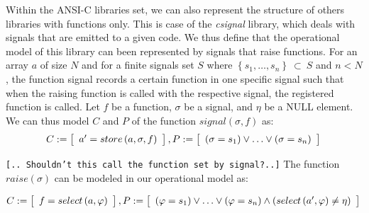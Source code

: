\documentclass[a4paper]{llncs}
\newcommand{\blurb}[1]{{\texttt{[.. #1..]}}}
\begin{document}
Within the ANSI-C libraries set, we can also represent the structure
of others libraries with functions only. This is case of the \textit{csignal}
library, which deals with signals that are emitted to a given code.
We thus define that the operational model of this library can been represented
by signals that raise functions. For an array $a$ of size $N$ and
for a finite signals set $S$ where $\left\{s_{1},\ldots, s_{n}\right\}\:\subset\:S$
and $n < N$, the function signal records a certain function in one specific signal
such that when the raising function is called with the respective signal,
the registered function is called. Let $f$ be a function, $\sigma$ be a signal,
and $\eta$ be a NULL element. We can thus model $C$ and $P$
of the function $signal\left(\sigma, f\right)$ as:
%
\begin{equation}
\label{quantifier-free-formulae-sginal}
C := \left [ \begin{array}{ll}
                a' = store\left(a,\sigma,f\right) \\
              \end{array} \right ],  \\
P := \left [ \begin{array}{ll}
                \left(\sigma = s_{1}\right) \vee \ldots \vee \left(\sigma = s_{n}\right) \\
              \end{array} \right ]  \\
\end{equation}

\blurb{Shouldn't this call the function set by signal?}
The function $raise\left(\sigma\right)$ can be modeled in our operational model as:
%

\begin{equation}
\label{quantifier-free-formulae-raise}
C := \left [ \begin{array}{ll}
                f = select\left(a,\varphi\right) \\
              \end{array} \right ],  \\
P := \left [ \begin{array}{ll}
                \left(\varphi = s_{1}\right) \vee \ldots \vee \left(\varphi = s_{n}\right) \wedge \left(select\left(a',\varphi\right) \neq \eta\right) \\
              \end{array} \right ]  \\
\end{equation}
\vspace*{-4ex}
\end{document}
